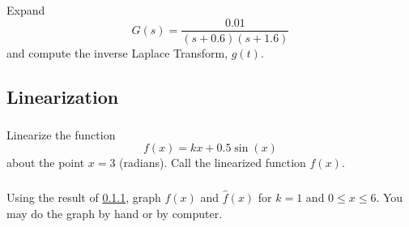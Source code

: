 \documentclass{article}	%
\newcommand{\sL}{\mathcal{L}}
\begin{document}
 \subsubsection{}

 Expand
 \[
 G(s) =  \frac              {0.01}                      {(s+0.6)(s+1.6)}
 \]
 and compute the inverse Laplace Transform, $g(t)$.



%
%



\subsection{Linearization}
 \subsubsection{}\label{linearizePone}
Linearize the function
\[
f(x) = kx + 0.5\sin(x)
\]
about the point $x=3$ (radians).  Call the linearized function $\hat{f}(x)$.

%
%
%
%
%
%



 \subsubsection{}
Using the result of \ref{linearizePone}, graph $f(x)$ and $\hat{f}(x)$ for $k=1$ and $0 \leq x \leq 6$.  You may do the graph by hand or by computer.


%
%
%
%
\end{document}
